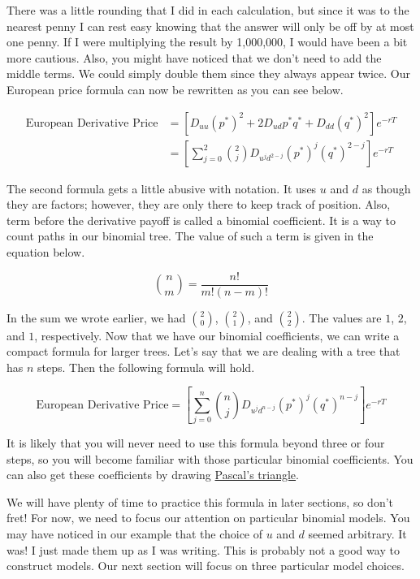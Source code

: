 \documentclass{ximera}
\begin{document}
There was a little rounding that I did in each calculation, but since it was to the nearest penny I can rest easy knowing that the answer will only be off by at most one penny. If I were multiplying the result by 1,000,000, I would have been a bit more cautious. Also, you might have noticed that we don't need to add the middle terms. We could simply double them since they always appear twice. Our European price formula can now be rewritten as you can see below. 

\begin{align*}
\text{European Derivative Price}	&=[D_{uu}(p^*)^2+2D_{ud}p^*q^*+D_{dd}(q^*)^2]e^{-rT}\\
					&=\left[\sum_{j=0}^2 \binom{2}{j}D_{u^jd^{2-j}}(p^*)^j(q^*)^{2-j}\right]e^{-rT}
\end{align*}

The second formula gets a little abusive with notation. It uses $u$ and $d$ as though they are factors; however, they are only there to keep track of position. Also, term before the derivative payoff is called a binomial coefficient. It is a way to count paths in our binomial tree. The value of such a term is given in the equation below. 

\begin{equation*}
\binom{n}{m}=\frac{n!}{m!(n-m)!}
\end{equation*}

In the sum we wrote earlier, we had $\binom{2}{0}$, $\binom{2}{1}$, and $\binom{2}{2}$. The values are $1$, $2$, and $1$, respectively. Now that we have our binomial coefficients, we can write a compact formula for larger trees. Let's say that we are dealing with a tree that has $n$ steps. Then the following formula will hold.

\begin{equation*}
\text{European Derivative Price}=\left[\sum_{j=0}^n \binom{n}{j}D_{u^jd^{n-j}}(p^*)^j(q^*)^{n-j}\right]e^{-rT}
\end{equation*}

It is likely that you will never need to use this formula beyond three or four steps, so you will become familiar with those particular binomial coefficients. You can also get these coefficients by drawing \href{https://en.wikipedia.org/wiki/Pascal's_triangle}{Pascal's triangle}.

We will have plenty of time to practice this formula in later sections, so don't fret! For now, we need to focus our attention on particular binomial models. You may have noticed in our example that the choice of $u$ and $d$ seemed arbitrary. It was! I just made them up as I was writing. This is probably not a good way to construct models. Our next section will focus on three particular model choices.
\end{document}
